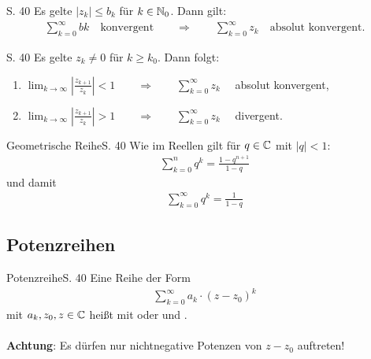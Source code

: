 \begin{satz}[Majorantenkriterium]{S. 40}
  Es gelte $|z_k| \leq b_k$ für $k \in \mathbb{N}_0$. Dann gilt:
  \begin{align}
    \sum_{k=0}^\infty bk \quad \text{konvergent} \qquad \Rightarrow \qquad \sum_{k=0}^\infty z_k \quad \text{absolut konvergent.}
  \end{align}
\end{satz}

\begin{satz}[Quotientenkriterium]{S. 40}
  Es gelte $z_k \neq 0$ für $k \geq k_0$. Dann folgt:
  \begin{enumerate}[label=\alph*)]
    \item $\displaystyle \lim_{k \to \infty} \left| \frac{z_{k+1}}{z_k} \right| < 1 \qquad \Rightarrow \qquad \sum_{k=0}^\infty z_k \quad$ absolut konvergent,
    \item $\displaystyle \lim_{k \to \infty} \left| \frac{z_{k+1}}{z_k} \right| > 1 \qquad \Rightarrow \qquad \sum_{k=0}^\infty z_k \quad$ divergent.
  \end{enumerate}
\end{satz}

\begin{bemerkung}{Geometrische Reihe}{S. 40}
  Wie im Reellen gilt für $q \in \mathbb{C}$ mit $|q| < 1$:
  \begin{align}
    \sum_{k=0}^n q^k = \frac{1 - q^{n+1}}{1-q}
  \end{align}
  und damit
  \begin{align}
    \sum_{k=0}^\infty q^k = \frac{1}{1-q}
  \end{align}
\end{bemerkung}



\pagebreak
\subsection{Potenzreihen}

\begin{bemerkung}{Potenzreihe}{S. 40}
  Eine Reihe der Form
  \begin{align}
    \sum_{k=0}^\infty a_k \cdot (z-z_0)^k \label{eq:potenzreihe}
  \end{align}
  mit $a_k, z_0, z \in \mathbb{C}$ heißt  mit  oder  und .\\
  \ \\
  \textbf{Achtung}: Es dürfen nur nichtnegative Potenzen von $z - z_0$ auftreten!
\end{bemerkung}

